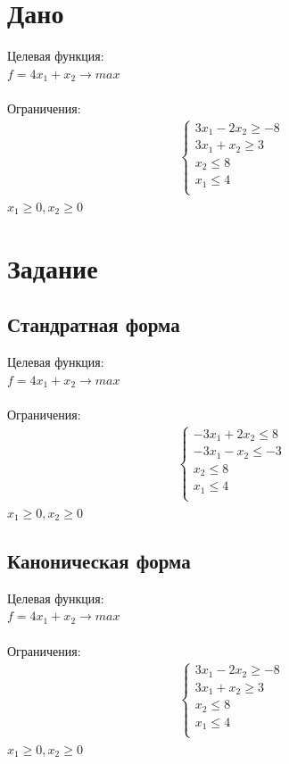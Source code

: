 \documentclass[14pt,a4paper,fleqn]{extarticle}
\begin{document}
\section*{Дано}
Целевая функция:\\
$f = 4x_1+x_2 \longrightarrow max$\\\\
Ограничения:
\begin{align*}
	\begin{cases}
		3x_1 - 2x_2 \geq -8\\
		3x_1 + x_2 \geq 3\\
		x_2 \leq 8\\
		x_1 \leq 4\\
	\end{cases}
\end{align*}
$x_1 \geq 0, x_2 \geq 0$

\section*{Задание}
\subsection*{Стандратная форма}
Целевая функция:\\
$f = 4x_1+x_2 \longrightarrow max$\\\\
Ограничения:
\begin{align*}
	\begin{cases}
		-3x_1 + 2x_2 \leq 8\\
		-3x_1 - x_2 \leq -3\\
		x_2 \leq 8\\
		x_1 \leq 4\\
	\end{cases}
\end{align*}
$x_1 \geq 0, x_2 \geq 0$
\newpage

\subsection*{Каноническая форма}
Целевая функция:\\
$f = 4x_1+x_2 \longrightarrow max$\\\\
Ограничения:
\begin{align*}
	\begin{cases}
		3x_1 - 2x_2 \geq -8\\
		3x_1 + x_2 \geq 3\\
		x_2 \leq 8\\
		x_1 \leq 4\\
	\end{cases}
\end{align*}
$x_1 \geq 0, x_2 \geq 0$\\
\end{document}
